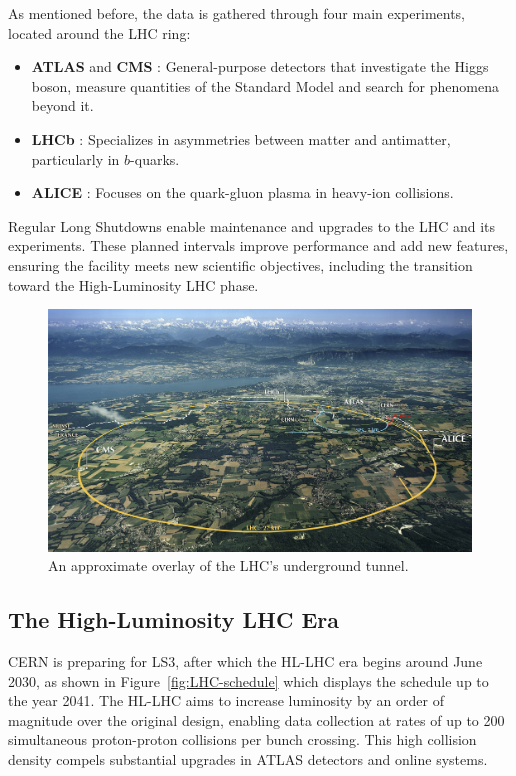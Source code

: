 As mentioned before, the data is gathered through four main experiments, located around the \acs{LHC} ring:
\begin{itemize}
    \item \textbf{ATLAS} \cite{atlas-experiment} and \textbf{CMS} \cite{cms-experiment}: General-purpose detectors that investigate the Higgs boson, measure quantities of the Standard Model and search for phenomena beyond it.
    \item \textbf{LHCb} \cite{lhcb-experiment}: Specializes in asymmetries between matter and antimatter, particularly in $b$-quarks. 
    \item \textbf{ALICE} \cite{alice-experiment}: Focuses on the quark-gluon plasma in heavy-ion collisions.
\end{itemize}

Regular Long Shutdowns enable maintenance and upgrades to the \acs{LHC} and its experiments. These planned intervals improve performance and add new features, ensuring the facility meets new scientific objectives, including the transition toward the High-Luminosity \acs{LHC} phase.

\begin{figure}[H]
\centering
\includegraphics[width=\textwidth]{images/introduction/LHC_map.jpg}
\caption{An approximate overlay of the \acs{LHC}'s underground tunnel. \protect\cite{lhc_tunnel_map}}
\label{fig:LHC}
\end{figure}

\subsection{The High-Luminosity \acs{LHC} Era}

\ac{CERN} is preparing for \acf{LS3}, after which the \acs{HL-LHC} era begins around June 2030, as shown in Figure~\ref{fig:LHC-schedule} which displays the schedule up to the year 2041. The \acf{HL-LHC} aims to increase luminosity by an order of magnitude over the original design, enabling data collection at rates of up to 200 simultaneous proton-proton collisions per bunch crossing. This high collision density compels substantial upgrades in \acs{ATLAS} detectors and online systems.

